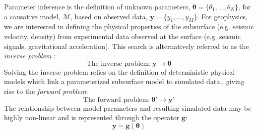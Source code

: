 Parameter inference is the definition of unknown parameters, $\bm{\theta} = \{\theta_1,...,\theta_N\}$, for a causative model, $\mathcal{M}$, based on observed data, $\bm{y} = \{y_1,...,y_M\}$. For geophysics, we are interested in defining the physical properties of the subsurface (e.g. seismic velocity, density) from experimental data observed at the surface (e.g. seismic signals, gravitational acceleration). This search is alternatively referred to as the \textit{inverse problem} \citep{Tarantola2005,Aster2013,Menke2012}: 
\begin{equation}
\text{The inverse problem:}\ \bm{y} \rightarrow \bm{\theta}
\label{inverse_problem}
\end{equation}
Solving the inverse problem relies on the definition of deterministic physical models which link a parameterized subsurface model to simulated data., giving rise to the \textit{forward problem}:
\begin{equation}
\text{The forward problem:}\ \bm{\theta'} \rightarrow \bm{y'}
\label{forward_problem}
\end{equation}
The relationship between model parameters and resulting simulated data may be highly non-linear and is represented through the operator $\bm{g}$:
\begin{equation}
\bm{y} = \bm{g}(\bm{\theta})
\label{basic_data_parameters}
\end{equation}


